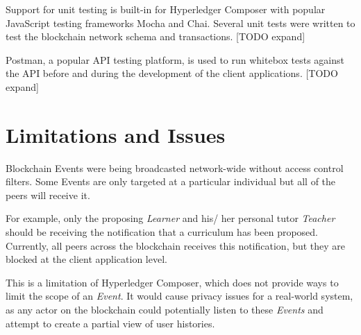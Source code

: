 Support for unit testing is built-in for Hyperledger Composer with popular JavaScript testing frameworks Mocha and Chai.
Several unit tests were written to test the blockchain network schema and transactions. [TODO expand]

Postman, a popular API testing platform, is used to run whitebox tests against the API 
before and during the development of the client applications. [TODO expand]

\section{Limitations and Issues}

Blockchain Events were being broadcasted network-wide without access control filters. 
Some Events are only targeted at a particular individual but all of the peers will receive it.

For example, only the proposing \textit{Learner} and his/ her personal tutor \textit{Teacher} should 
be receiving the notification that a curriculum has been proposed. Currently, all peers across the 
blockchain receives this notification, but they are blocked at the client application level.

This is a limitation of Hyperledger Composer, which does not provide ways to limit the scope of an \textit{Event}.
It would cause privacy issues for a real-world system, as any actor on the blockchain could potentially 
listen to these \textit{Events} and attempt to create a partial view of user histories.
